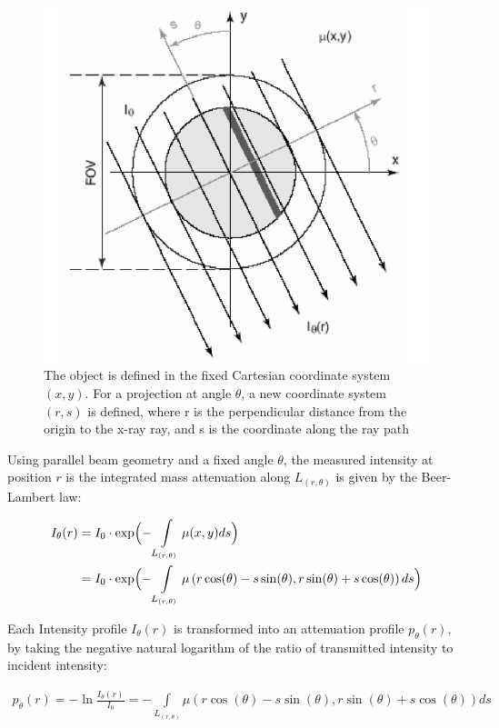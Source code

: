 \documentclass{article}
\begin{document}
\begin{figure}[H]
	\includegraphics[scale=0.6]{coordinate_system.png}
	\caption{The object is defined in the fixed Cartesian coordinate system $(x,y)$. For a projection at angle $\theta$, a new coordinate system $(r,s)$ is defined, where r is the perpendicular distance from the origin to the x-ray ray, and s is the coordinate along the ray path}
	\label{fig:coord}
\end{figure}

Using parallel beam geometry and a fixed angle $\theta$, the measured intensity at position $r$ is the integrated mass attenuation  along $L_{(r,\theta)}$ is given by the Beer-Lambert law:

\begin{align}
I_{\theta}(r) &= I_0 \cdot \exp\Bigl({-\int\limits_{L_{(r,\theta)}} \mu (x,y) ds} \Bigr) \\
& = I_0 \cdot \exp\Bigl({-\int\limits_{L_{(r,\theta)}} \mu \left(r \cos(\theta) - s \sin(\theta),r \sin(\theta) + s \cos(\theta)\right) ds} \Bigr) 
\end{align}

Each Intensity profile $I_\theta (r)$ is transformed into an attenuation profile $p_\theta (r)$, by taking the negative natural logarithm of the ratio of transmitted intensity to incident intensity:

\begin{align}
p_\theta (r) = - \ln \frac{I_\theta (r)}{I_0} = -\int\limits_{L_{(r,\theta)}} \mu \left(r \cos(\theta) - s \sin(\theta),r \sin(\theta) + s \cos(\theta)\right) ds
\end{align}
\end{document}
